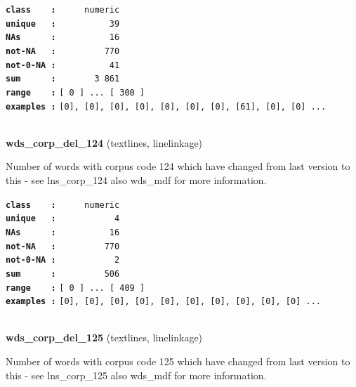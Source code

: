 \documentclass[]{article}
\begin{document}
\textbf{\texttt{class\ \ \ \ :}} \texttt{~~~~~numeric}\\
\textbf{\texttt{unique\ \ \ :}} \texttt{~~~~~~~~~~39}\\
\textbf{\texttt{NAs\ \ \ \ \ \ :}} \texttt{~~~~~~~~~~16}\\
\textbf{\texttt{not-NA\ \ \ :}} \texttt{~~~~~~~~~770}\\
\textbf{\texttt{not-0-NA\ :}} \texttt{~~~~~~~~~~41}\\
\textbf{\texttt{sum\ \ \ \ \ \ :}} \texttt{~~~~~~~3~861}\\
\textbf{\texttt{range\ \ \ \ :}}
\texttt{{[}\ 0\ {]}\ ...\ {[}\ 300\ {]}}\\
\textbf{\texttt{examples\ :}}
\texttt{{[}0{]},\ {[}0{]},\ {[}0{]},\ {[}0{]},\ {[}0{]},\ {[}0{]},\ {[}0{]},\ {[}61{]},\ {[}0{]},\ {[}0{]}\ ...}\\

~

\textbf{wds\_corp\_del\_124} (textlines, linelinkage)

Number of words with corpus code 124 which have changed from last
version to this - see lns\_corp\_124 also wds\_mdf for more information.

\textbf{\texttt{class\ \ \ \ :}} \texttt{~~~~~numeric}\\
\textbf{\texttt{unique\ \ \ :}} \texttt{~~~~~~~~~~~4}\\
\textbf{\texttt{NAs\ \ \ \ \ \ :}} \texttt{~~~~~~~~~~16}\\
\textbf{\texttt{not-NA\ \ \ :}} \texttt{~~~~~~~~~770}\\
\textbf{\texttt{not-0-NA\ :}} \texttt{~~~~~~~~~~~2}\\
\textbf{\texttt{sum\ \ \ \ \ \ :}} \texttt{~~~~~~~~~506}\\
\textbf{\texttt{range\ \ \ \ :}}
\texttt{{[}\ 0\ {]}\ ...\ {[}\ 409\ {]}}\\
\textbf{\texttt{examples\ :}}
\texttt{{[}0{]},\ {[}0{]},\ {[}0{]},\ {[}0{]},\ {[}0{]},\ {[}0{]},\ {[}0{]},\ {[}0{]},\ {[}0{]},\ {[}0{]}\ ...}\\

~

\textbf{wds\_corp\_del\_125} (textlines, linelinkage)

Number of words with corpus code 125 which have changed from last
version to this - see lns\_corp\_125 also wds\_mdf for more information.
\end{document}

